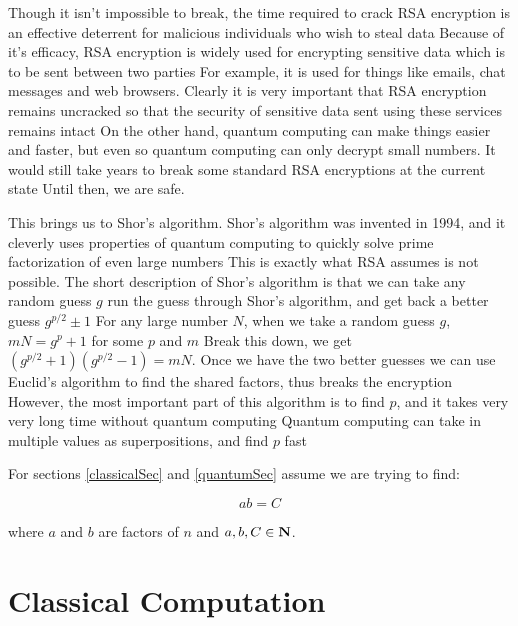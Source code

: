 \documentclass[a4paper]{article}
\begin{document}


Though it isn't impossible to break, the time required to crack RSA encryption is an effective deterrent for malicious individuals who wish to steal data
 Because of it's efficacy, RSA encryption is widely used for encrypting sensitive data which is to be sent between two parties
 For example, it is used for things like emails, chat messages and web browsers. Clearly
 it is very important that RSA encryption remains uncracked so that the security of sensitive data sent using these services remains intact
 On the other hand, quantum computing can make things easier and faster, but even so
 quantum computing can only decrypt small numbers. It would still take years to break some standard RSA encryptions at the current state
 Until then, we are safe.




This brings us to Shor's algorithm. Shor's algorithm was invented in 1994, and it cleverly uses properties of quantum computing to quickly solve prime factorization of even large numbers
 This is exactly what RSA assumes is not possible. The short description of Shor's algorithm is that we can take any random guess $g$
 run the guess through Shor's algorithm, and get back a better guess $g^{p/2} \pm 1$
 For any large number $N$, when we take a random guess $g$, $mN = g^p +1$ for some $p$ and $m$
 Break this down, we get $(g^{p/2}+1)(g^{p/2}-1) = mN$. Once we have the two better guesses
 we can use Euclid's algorithm to find the shared factors, thus breaks the encryption
 However, the most important part of this algorithm is to find $p$, and it takes very very long time without quantum computing
 Quantum computing can take in multiple values as superpositions, and find $p$ fast


For sections \ref{classicalSec} and \ref{quantumSec} assume we are trying to find: 

$$ab = C$$

where $a$ and $b$ are factors of $n$ and $a,b,C \in \mathbf{N}$.



\section{Classical Computation}
\end{document}
